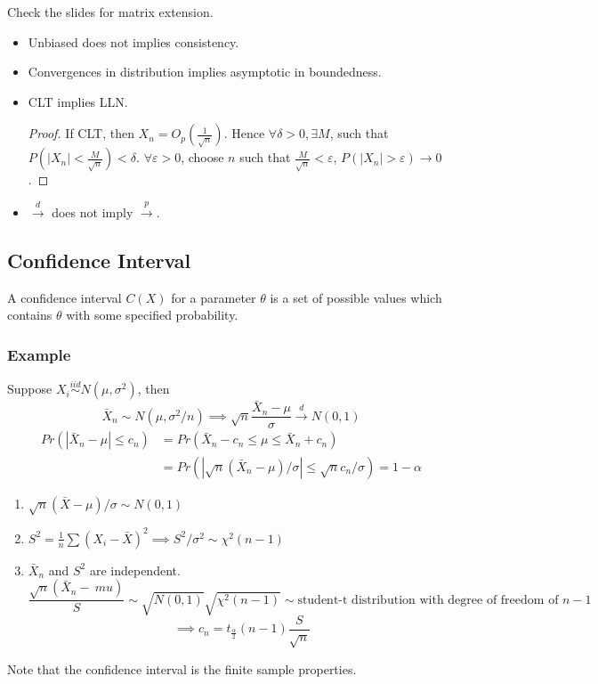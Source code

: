 \documentclass[11pt, a4paper, oneside]{article}
\theoremstyle{definition}
\theoremstyle{proposition}
\theoremstyle{corollary}
\theoremstyle{lemma}
\theoremstyle{theorem}
\begin{document}
Check the slides for matrix extension.

\begin{itemize}
\item Unbiased does not implies consistency.
\item Convergences in distribution implies asymptotic in boundedness. 
\item CLT implies LLN. 
\begin{proof}
If CLT, then $X_n = O_p(\frac{1}{\sqrt{n}})$. Hence $\forall \delta > 0, \exists M$, such that $P(|X_n| < \frac{M}{\sqrt{n}}) < \delta$. $\forall \varepsilon > 0$, choose $n$ such that $\frac{M}{\sqrt{n}} < \varepsilon$, $P(|X_n| > \varepsilon) \to 0$. 
\end{proof}
\item $\overset{d}{\to}$ does not imply $\overset{p}{\to}$. 
\end{itemize}

\subsection{Confidence Interval}
A confidence interval $C(X)$ for a parameter $\theta$ is a set of possible values which contains $\theta$ with some specified probability. 

\subsubsection*{Example}
Suppose $X_i \overset{iid}{\sim} N(\mu, \sigma^2)$, then
$$\bar{X}_n \sim N(\mu, \sigma^2/n) \implies \sqrt{n}\frac{\bar{X}_n - \mu}{\sigma} \overset{d}{\to} N(0, 1)$$
\begin{align*}
Pr(|\bar{X}_n - \mu| \leq c_n) &= Pr(\bar{X}_n - c_ n \leq \mu \leq \bar{X}_n + c_n) \\ 
&=Pr(|\sqrt{n}(\bar{X}_n -\mu)/\sigma| \leq \sqrt{n} c_n /\sigma) = 1 - \alpha
\end{align*}

\begin{enumerate}
\item $\sqrt{n}(\bar{X} -\mu)/\sigma \sim N(0, 1)$
\item $S^2 = \frac{1}{n}\sum (X_i - \bar{X})^2 \implies S^2/\sigma^2 \sim \chi^2(n-1)$
\item $\bar{X}_n$ and $S^2$ are independent. $$\frac{\sqrt{n}(\bar{X}_n - \ mu)}{S} \sim \sqrt{N(0,1)}{\sqrt{\chi^2(n-1)}} \sim \text{student-t distribution with degree of freedom of } n -1$$
$$ \implies c_n = t_{\frac{\alpha}{2}}(n-1)\frac{S}{\sqrt{n}}$$
\end{enumerate}
Note that the confidence interval is the finite sample properties. 
\end{document}
